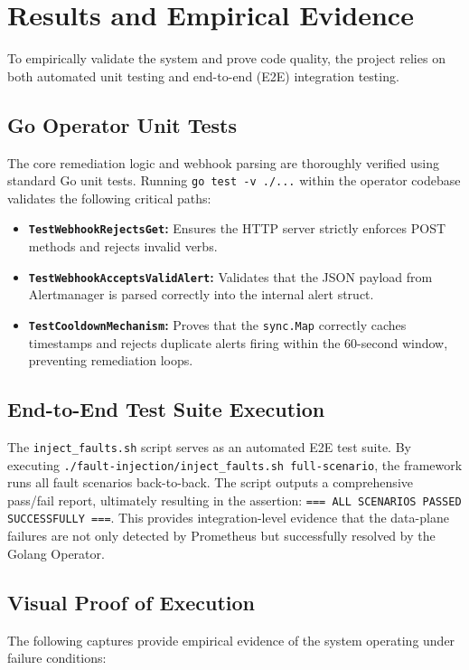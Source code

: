 \documentclass[12pt,a4paper]{article}
\begin{document}
\section{Results and Empirical Evidence}
\onehalfspacing
To empirically validate the system and prove code quality, the project relies on both automated unit testing and end-to-end (E2E) integration testing.

\subsection{Go Operator Unit Tests}
The core remediation logic and webhook parsing are thoroughly verified using standard Go unit tests. Running \texttt{go test -v ./...} within the operator codebase validates the following critical paths:
\begin{itemize}
    \item \textbf{\texttt{TestWebhookRejectsGet}:} Ensures the HTTP server strictly enforces POST methods and rejects invalid verbs.
    \item \textbf{\texttt{TestWebhookAcceptsValidAlert}:} Validates that the JSON payload from Alertmanager is parsed correctly into the internal alert struct.
    \item \textbf{\texttt{TestCooldownMechanism}:} Proves that the \texttt{sync.Map} correctly caches timestamps and rejects duplicate alerts firing within the 60-second window, preventing remediation loops.
\end{itemize}

\subsection{End-to-End Test Suite Execution}
The \texttt{inject\_faults.sh} script serves as an automated E2E test suite. By executing \texttt{./fault-injection/inject\_faults.sh full-scenario}, the framework runs all fault scenarios back-to-back. The script outputs a comprehensive pass/fail report, ultimately resulting in the assertion: \texttt{=== ALL SCENARIOS PASSED SUCCESSFULLY ===}. This provides integration-level evidence that the data-plane failures are not only detected by Prometheus but successfully resolved by the Golang Operator.

\subsection{Visual Proof of Execution}
The following captures provide empirical evidence of the system operating under failure conditions:
\end{document}
